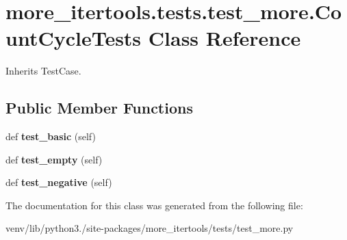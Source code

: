 \hypertarget{classmore__itertools_1_1tests_1_1test__more_1_1_count_cycle_tests}{}\section{more\+\_\+itertools.\+tests.\+test\+\_\+more.\+Count\+Cycle\+Tests Class Reference}
\label{classmore__itertools_1_1tests_1_1test__more_1_1_count_cycle_tests}


Inherits Test\+Case.

\subsection*{Public Member Functions}
\begin{DoxyCompactItemize}
\item 
\mbox{\label{classmore__itertools_1_1tests_1_1test__more_1_1_count_cycle_tests_a9dfb2f17dffc71ff143aa953751925ff}} 
def {\bfseries test\+\_\+basic} (self)
\item 
\mbox{\label{classmore__itertools_1_1tests_1_1test__more_1_1_count_cycle_tests_a74e1bb891e17fa77205c11aafe2b321c}} 
def {\bfseries test\+\_\+empty} (self)
\item 
\mbox{\label{classmore__itertools_1_1tests_1_1test__more_1_1_count_cycle_tests_af2392d748a32724a3b1668c1ad6f910b}} 
def {\bfseries test\+\_\+negative} (self)
\end{DoxyCompactItemize}


The documentation for this class was generated from the following file\+:\begin{DoxyCompactItemize}
\item 
venv/lib/python3./site-\/packages/more\+\_\+itertools/tests/test\+\_\+more.\+py\end{DoxyCompactItemize}
